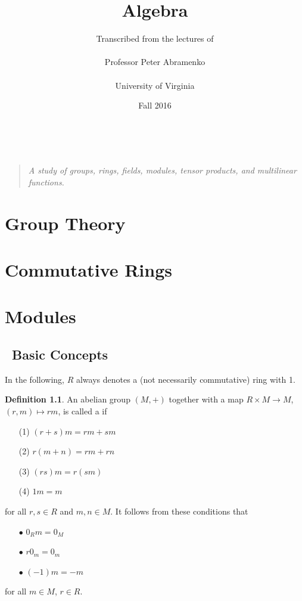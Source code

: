 \documentclass[11pt]{book}
\title{Algebra}
\author{ Transcribed from the lectures of \\ \ \\ Professor Peter Abramenko \\ \ \\ University of Virginia}
\date{Fall 2016}
\theoremstyle{definition}   \newtheorem{defn}[counter]{Definition} %
\DeclareMathOperator{\ra}{\rightarrow}   \DeclareMathOperator{\Poly}{\mathbf{P}}   \DeclareMathOperator{\spn}{\textnormal{span}}   \DeclareMathOperator{\aut}{\textnormal{Aut}}
\newcommand{\vs}{\vspace{8pt}}
\numberwithin{counter}{chapter}
\begin{document}
\frontmatter
\maketitle
\tableofcontents
\mainmatter

\ \vspace{100pt}
\begin{quote}
\centering
\textit{A study of groups, rings, fields, modules, tensor products, and multilinear functions.}
\end{quote}

\part{Group Theory}


\part{Commutative Rings}


\part{Modules}

\chapter{\null \quad \ Basic Concepts}

In the following, $R$ always denotes a (not necessarily commutative) ring with 1. 

\vs

\begin{defn}
An abelian group $(M,+)$ together with a map $R \times M \ra M$, $(r,m) \mapsto rm$, is called a  if
\begin{enumerate}
\item[(1)] $(r+s)m = rm + sm$
\item[(2)] $r(m+n) = rm + rn$
\item[(3)] $(rs)m = r(sm)$
\item[(4)] $1 m = m$
\end{enumerate}
for all $r,s \in R$ and $m,n \in M$. It follows from these conditions that
\begin{enumerate}
\item[$\bullet$] $0_R m = 0_M$
\item[$\bullet$] $r0_m = 0_m$
\item[$\bullet$] $(-1)m = -m$
\end{enumerate}
for all $m \in M$, $r \in R$.
\end{defn}
\end{document}
